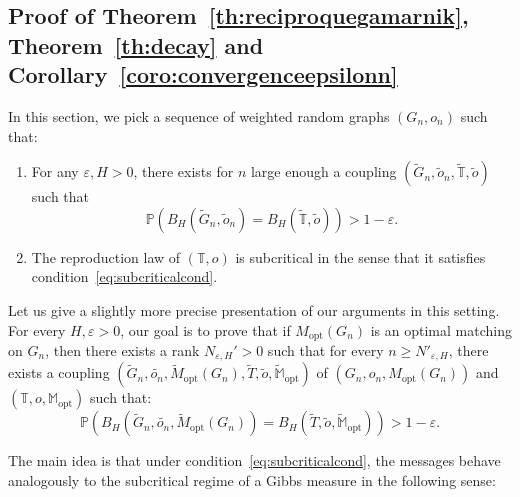 \documentclass[11pt]{article}
\newcommand{\eps}{\varepsilon}
\begin{document}
\subsection{Proof of Theorem~\ref{th:reciproquegamarnik}, Theorem~\ref{th:decay} and Corollary~\ref{coro:convergenceepsilonn} }
In this section, we pick a sequence of weighted random graphs $(G_n,o_n)$ such that:
\begin{enumerate}[label=\roman*)]
\item For any $\eps, H >0$, there exists for $n$ large enough a coupling $(\tilde{G}_n,\tilde{o}_n,\tilde{ \mathbb T},\tilde{o})$ such that
\begin{equation*}
    \mathbb{P}\left( B_H(\tilde{G}_n,\tilde{o}_n)=B_H( \tilde{\mathbb{T}},\tilde{o}) \right) > 1-\eps.
\end{equation*}
\item The reproduction law of $(\mathbb{T},o)$ is subcritical in the sense that it satisfies condition~\eqref{eq:subcriticalcond}.
\end{enumerate}


Let us give a slightly more precise presentation of our arguments in this setting.
For every $H,\varepsilon >0$, our goal is to prove that if $M_{\mathrm{opt}}(G_n)$ is an optimal matching on $G_n$, then there exists a rank $N_{\eps,H}'>0$ such that for every $n \geq N'_{\eps,H}$, there exists a coupling $(\tilde{G}_n,\tilde{o_n},\tilde{M}_{\mathrm{opt}}(G_n),\tilde{T},\tilde{o},\tilde{\mathbb{M}}_{\mathrm{opt}})$ of $(G_n,o_n,M_{\mathrm{opt}}(G_n))$ and $(\mathbb{T},o,\mathbb{M}_{\mathrm{opt}})$ such that:
\begin{equation}
    \mathbb{P}\left( B_H(\tilde{G}_n,\tilde{o_n},\tilde{M}_{\mathrm{opt}}(G_n))=B_H(\tilde{T},\tilde{o},\tilde{\mathbb{M}}_{\mathrm{opt}})  \right)>1-\eps.
\end{equation}

The main idea is that under condition~\eqref{eq:subcriticalcond}, the messages behave analogously to the subcritical regime of a Gibbs measure in the following sense:
\end{document}
